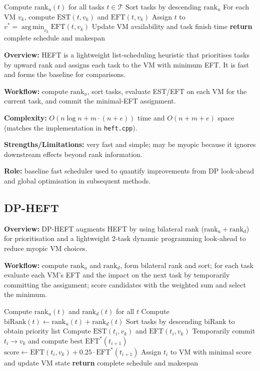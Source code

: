 \documentclass[conference]{IEEEtran}
\DeclareMathOperator*{\argmin}{arg\,min}
\newcommand{\EST}{\mathrm{EST}}
\newcommand{\EFT}{\mathrm{EFT}}
\newcommand{\ranku}{\mathrm{rank}_u}
\newcommand{\rankd}{\mathrm{rank}_d}
\begin{document}
\begin{algorithm}[!t]
\caption{HEFT Scheduling (Greedy EFT)}
\label{alg:heft}
\begin{algorithmic}[1]
\STATE Compute $\ranku(t)$ for all tasks $t \in \mathcal{T}$
\STATE Sort tasks by descending $\ranku$
    \STATE For each VM $v_k$, compute $\EST(t,v_k)$ and $\EFT(t,v_k)$
    \STATE Assign $t$ to $v^* = \argmin_{v_k} \EFT(t,v_k)$
    \STATE Update VM availability and task finish time
\ENDFOR
\STATE \textbf{return} complete schedule and makespan
\end{algorithmic}
\end{algorithm}

\textbf{Overview:} HEFT is a lightweight list-scheduling heuristic
that prioritises tasks by upward rank and assigns each task to the VM
with minimum EFT. It is fast and forms the baseline for comparisons.

\textbf{Workflow:} compute $\ranku$, sort tasks, evaluate EST/EFT on
each VM for the current task, and commit the minimal-EFT assignment.

\textbf{Complexity:} $O(n\log n + m\cdot(n+e))$ time and
$O(n+m+e)$ space (matches the implementation in \texttt{heft.cpp}).

\textbf{Strengths/Limitations:} very fast and simple; may be myopic
because it ignores downstream effects beyond rank information.

\textbf{Role:} baseline fast scheduler used to quantify improvements
from DP look-ahead and global optimisation in subsequent methods.

\subsection{DP-HEFT}

\textbf{Overview:} DP-HEFT augments HEFT by using bilateral rank
($\ranku+\rankd$) for prioritisation and a lightweight 2-task dynamic
programming look-ahead to reduce myopic VM choices.

\textbf{Workflow:} compute $\ranku$ and $\rankd$, form bilateral rank
and sort; for each task evaluate each VM's EFT and the impact on the
next task by temporarily committing the assignment; score candidates
with the weighted sum and select the minimum.

\begin{algorithm}[!t]
\caption{DP-HEFT (Bilateral-Rank + 2-Task Look-Ahead)}
\begin{algorithmic}[1]
\STATE Compute $\ranku(t)$ and $\rankd(t)$ for all $t$
\STATE Compute $\mathrm{biRank}(t) \leftarrow \ranku(t)+\rankd(t)$
\STATE Sort tasks by descending $\mathrm{biRank}$ to obtain priority list
            \STATE Compute $\EST(t_i,v_k)$ and $\EFT(t_i,v_k)$
            \STATE Temporarily commit $t_i\to v_k$ and compute best $\EFT^*(t_{i+1})$
            \STATE $\mathrm{score} \leftarrow \EFT(t_i,v_k) + 0.25\cdot\EFT^*(t_{i+1})$
      \ENDFOR
      \STATE Assign $t_i$ to VM with minimal score and update VM state
\ENDFOR
\STATE \textbf{return} complete schedule and makespan
\end{algorithmic}
\end{algorithm}
\end{document}
